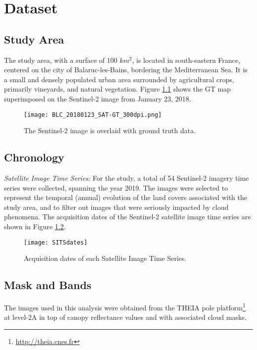 \chapter{Dataset}

\section{Study Area}
The study area, with a surface of 100 $ km^2 $, is located in south-eastern France, centered on the city of Balaruc-les-Bains, bordering the Mediterranean Sea. 
It is a small and densely populated urban area surrounded by agricultural crops, primarily vineyards, and natural vegetation.
Figure \ref{fig:gtmap} shows the GT map superimposed on the Sentinel-2 image from January 23, 2018.

\begin{figure}[H]
  \centering
  \texttt{[image: BLC\_20180123\_SAT-GT\_300dpi.png]}
  \caption{The Sentinel-2 image is overlaid with ground truth data.}
  \label{fig:gtmap}
\end{figure}


\section{Chronology}

\textit{Satellite Image Time Series:} 
For the study, a total of 54 Sentinel-2 imagery time series were collected, spanning the year 2019. 
The images were selected to represent the temporal (annual) evolution of the land covers associated with the study area, and to filter out images that were seriously impacted by cloud phenomena.
The acquisition dates of the Sentinel-2 satellite image time series are shown in Figure \ref{fig:sitsdates}.

\begin{figure}[H]
  \centering
  \texttt{[image: SITSdates]}
  \caption{Acquisition dates of each Satellite Image Time Series.}
  \label{fig:sitsdates}
\end{figure}

\section{Mask and Bands}


The images used in this analysis were obtained from the THEIA pole platform\footnote{\url{http://theia.cnes.fr}} at level-2A in top of canopy reflectance values and with associated cloud masks.

